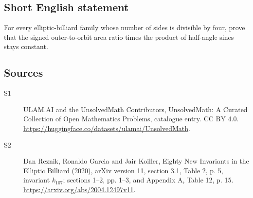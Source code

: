 \documentclass[11pt]{article}
\begin{document}
\subsection{Short English statement}
For every elliptic-billiard family whose number of sides is divisible by four, prove that the signed outer-to-orbit area ratio times the product of half-angle sines stays constant.
\subsection{Sources}
\begin{description}
\item[\hypertarget{source:statement:1}{S1}] ULAM.AI and the UnsolvedMath Contributors, UnsolvedMath: A Curated Collection of Open Mathematics Problems, catalogue entry. CC BY 4.0. \url{https://huggingface.co/datasets/ulamai/UnsolvedMath}.
\item[\hypertarget{source:statement:2}{S2}] Dan Reznik, Ronaldo Garcia and Jair Koiller, Eighty New Invariants in the Elliptic Billiard (2020), arXiv version 11, section 3.1, Table 2, p. 5, invariant $k_{107}$; sections 1--2, pp. 1--3, and Appendix A, Table 12, p. 15. \url{https://arxiv.org/abs/2004.12497v11}.
\end{description}
\label{end:statement}
\end{document}
